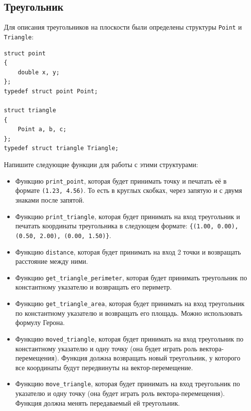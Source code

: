 \documentclass{article}
\begin{document}
\subsection{Треугольник}
Для описания треугольников на плоскости были определены структуры \texttt{Point} и \texttt{Triangle}:
\begin{lstlisting}
struct point 
{
    double x, y;
};
typedef struct point Point;

struct triangle 
{
    Point a, b, c;
};
typedef struct triangle Triangle;
\end{lstlisting}
Напишите следующие функции для работы с этими структурами:
\begin{itemize}
\item Функцию \texttt{print\_point}, которая будет принимать точку и печатать её в формате \texttt{(1.23, 4.56)}. То есть в круглых скобках, через запятую и с двумя знаками после запятой.

\item Функцию \texttt{print\_triangle}, которая будет принимать на вход треугольник и печатать координаты треугольника в следующем формате: \texttt{\{(1.00, 0.00), (0.50, 2.00), (0.00, 1.50)\}}.

\item Функцию \texttt{distance}, которая будет принимать на вход 2 точки и возвращать расстояние между ними.

\item Функцию \texttt{get\_triangle\_perimeter}, которая будет принимать треугольник по константному указателю и возвращать его периметр.

\item Функцию \texttt{get\_triangle\_area}, которая будет принимать на вход треугольник по константному указателю и возвращать его площадь. Можно использовать формулу Герона.

\item Функцию \texttt{moved\_triangle}, которая будет принимать на вход треугольник по константному указателю и одну точку (она будет играть роль вектора-перемещения). Функция должна возвращать новый треугольник, у которого все координаты будут передвинуты на вектор-перемещение.

\item Функцию \texttt{move\_triangle}, которая будет принимать на вход треугольник по указателю и одну точку (она будет играть роль вектора-перемещения). Функция должна менять передаваемый ей треугольник.
\end{itemize}
\end{document}
